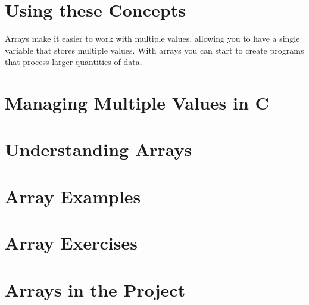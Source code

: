 \section{Using these Concepts} %
\label{sec:arrays_using_these_concepts}

Arrays make it easier to work with multiple values, allowing you to have a single variable that stores multiple values. With arrays you can start to create programs that process larger quantities of data.





\clearpage
\def\pageLang{c}
\section{Managing Multiple Values in C} %
\label{sec:arrays_in_c}









\clearpage
\def\pageLang{none}
\section{Understanding Arrays} %
\label{sec:understanding_arrays}




\clearpage
\section{Array Examples} %
\label{sec:array_examples}



\clearpage
\section{Array Exercises} %
\label{sec:array_exercises}



\clearpage
\section{Arrays in the Project} %
\label{sec:arrays_in_the_project}

